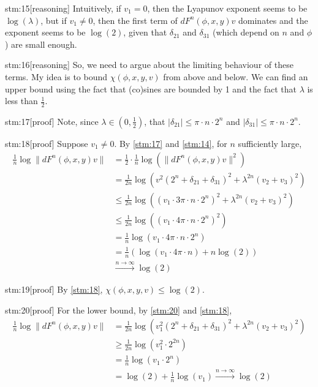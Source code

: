 \documentclass{article}
\begin{document}
\begin{stm}{stm:15}[reasoning]
Intuitively, if $v_1 = 0$, then the Lyapunov exponent seems to be $\log(\lambda)$, but if $v_1 \neq 0$, then the first term of $dF^n(\phi, x, y)v$ dominates and the exponent seems to be $\log(2)$, given that $\delta_{21}$ and $\delta_{31}$ (which depend on $n$ and $\phi$) are small enough.
\end{stm}

\begin{stm}{stm:16}[reasoning]
So, we need to argue about the limiting behaviour of these terms. My idea is to bound $\chi(\phi, x, y, v)$ from above and below. We can find an upper bound using the fact that (co)sines are bounded by 1 and the fact that $\lambda$ is less than $\frac{1}{2}$.
\end{stm}

\begin{stm}{stm:17}[proof]
Note, since $\lambda \in (0, \frac{1}{2})$, that $|\delta_{21}| \le \pi \cdot n \cdot 2^n$ and $|\delta_{31}| \le \pi \cdot n \cdot 2^n$.
\end{stm}

\begin{stm}{stm:18}[proof]
Suppose $v_1 \neq 0$. By \ref{stm:17} and \ref{stm:14}, for $n$ sufficiently large,
\begin{align*}
\frac{1}{n} \log \| dF^n(\phi, x, y)v \| 
&= \frac{1}{2} \cdot \frac{1}{n} \log \left( \| dF^n(\phi, x, y)v \|^2 \right) \\
&= \frac{1}{2n} \log \left( v^2 (2^n + \delta_{21} + \delta_{31})^2 + \lambda^{2n}(v_2 + v_3)^2 \right) \\
&\le \frac{1}{2n} \log \left( (v_1 \cdot 3 \pi \cdot n \cdot 2^n)^2 + \lambda^{2n}(v_2 + v_3)^2 \right) \\
&\le \frac{1}{2n} \log \left( (v_1 \cdot 4 \pi \cdot n \cdot 2^n)^2 \right) \\
&= \frac{1}{n} \log (v_1 \cdot 4 \pi \cdot n \cdot 2^n) \\
&= \frac{1}{n} \left( \log(v_1 \cdot 4 \pi \cdot n) + n \log(2) \right)\\
&\xrightarrow{n \to \infty} \log(2)
\end{align*}
\end{stm}

\begin{stm}{stm:19}[proof]
By \ref{stm:18}, $\chi(\phi, x, y, v) \le \log(2)$.
\end{stm}

\begin{stm}{stm:20}[proof]
For the lower bound, by \ref{stm:20} and \ref{stm:18},
\begin{align*}
\frac{1}{n} \log \| dF^n(\phi, x, y)v \| 
&= \frac{1}{2n} \log \left( v_1^2(2^n + \delta_{21} + \delta_{31})^2 + \lambda^{2n}(v_2 + v_3)^2 \right) \\
&\ge \frac{1}{2n} \log \left( v_1^2 \cdot 2^{2n} \right) \\
&= \frac{1}{n} \log (v_1 \cdot 2^n) \\
&= \log(2) + \frac{1}{n} \log(v_1) \xrightarrow{n \to \infty} \log(2)
\end{align*}
\end{stm}
\end{document}
